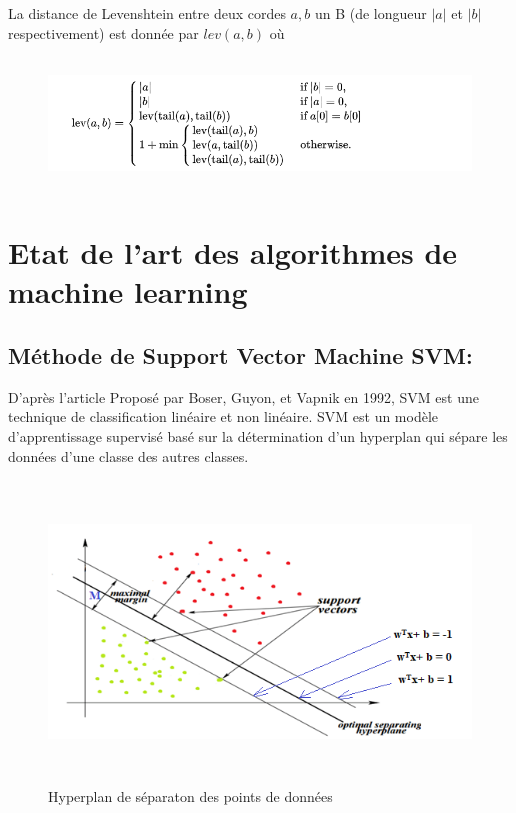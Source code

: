 La distance de Levenshtein entre deux cordes $a, b$ un B (de longueur $|a|$ et $|b|$ respectivement) est donnée par ${lev} (a,b)$ où

\begin{figure}[h]
\begin{center}
\includegraphics[width=15cm,height=3.5cm]{images/distance_levenshtein.png}
\label{monlabel}
\end{center}
\end{figure}

\newpage
\section{Etat de l’art des algorithmes de machine learning}

\subsection{Méthode de Support Vector Machine SVM:}
D’après l’article Proposé par Boser, Guyon, et Vapnik en 1992, SVM est une technique de classification linéaire et non linéaire.
SVM est un modèle d’apprentissage supervisé basé sur la détermination d’un hyperplan qui sépare les données d’une classe des autres classes.
\begin{figure}[h]
\begin{center}
\includegraphics[width=15cm,height=8cm]{images/svm_separate.png}
\caption[Hyperplan de séparaton des points de données]{Hyperplan de séparaton des points de données}
\label{monlabel}
\end{center}
\end{figure}


